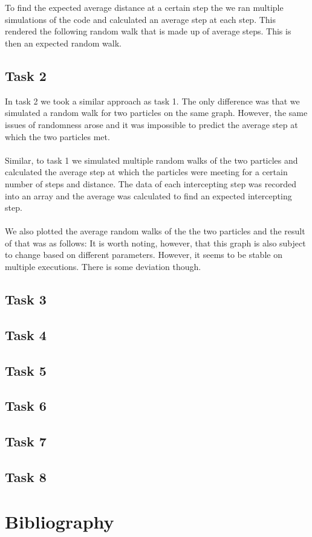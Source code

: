\documentclass{article}
\begin{document}
\\\\
To find the expected average distance at a certain step the we ran multiple 
simulations of the code and calculated an average step at each step. This rendered
the following random walk that is made up of average steps. This is then an expected
random walk. 

\subsection{Task 2}
In task 2 we took a similar approach as task 1. The only difference was that we simulated a random walk 
for two particles on the same graph. However, the same issues of randomness arose and it was impossible to
predict the average step at which the two particles met. 
\\\\
Similar, to task 1 we simulated multiple random walks of the two particles and calculated the average step 
at which the particles were meeting for a certain number of steps and distance. The data of each intercepting 
step was recorded into an array and the average was calculated to find an expected intercepting step.
\\\\
We also plotted the average random walks of the the two particles and the result of that was as follows:
It is worth noting, however, that this graph is also subject to change based on different parameters. However, 
it seems to be stable on multiple executions. There is some deviation though. 
\subsection{Task 3}
\subsection{Task 4}
\subsection{Task 5}

\subsection{Task 6}
\subsection{Task 7}
\subsection{Task 8}
\section{Bibliography}
\end{document}
